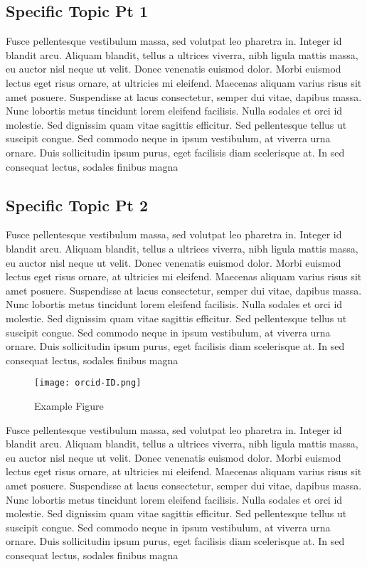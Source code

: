 \documentclass[linenumbers,RNAAS,trackchanges]{aastex631}
\begin{document}
\subsection{Specific Topic Pt 1} \label{sec:subtopic1}
Fusce pellentesque vestibulum massa, sed volutpat leo pharetra in. Integer id blandit arcu. Aliquam blandit, tellus a ultrices viverra, nibh ligula mattis massa, eu auctor nisl neque ut velit. Donec venenatis euismod dolor. Morbi euismod lectus eget risus ornare, at ultricies mi eleifend. Maecenas aliquam varius risus sit amet posuere. Suspendisse at lacus consectetur, semper dui vitae, dapibus massa. Nunc lobortis metus tincidunt lorem eleifend facilisis. Nulla sodales et orci id molestie. Sed dignissim quam vitae sagittis efficitur. Sed pellentesque tellus ut suscipit congue. Sed commodo neque in ipsum vestibulum, at viverra urna ornare. Duis sollicitudin ipsum purus, eget facilisis diam scelerisque at. In sed consequat lectus, sodales finibus magna


\subsection{Specific Topic Pt 2} \label{sec:subtopic2}
Fusce pellentesque vestibulum massa, sed volutpat leo pharetra in. Integer id blandit arcu. Aliquam blandit, tellus a ultrices viverra, nibh ligula mattis massa, eu auctor nisl neque ut velit. Donec venenatis euismod dolor. Morbi euismod lectus eget risus ornare, at ultricies mi eleifend. Maecenas aliquam varius risus sit amet posuere. Suspendisse at lacus consectetur, semper dui vitae, dapibus massa. Nunc lobortis metus tincidunt lorem eleifend facilisis. Nulla sodales et orci id molestie. Sed dignissim quam vitae sagittis efficitur. Sed pellentesque tellus ut suscipit congue. Sed commodo neque in ipsum vestibulum, at viverra urna ornare. Duis sollicitudin ipsum purus, eget facilisis diam scelerisque at. In sed consequat lectus, sodales finibus magna

\begin{figure}[H]
    \centering
    \texttt{[image: orcid-ID.png]}
    \caption{Example Figure}
    \label{fig:my_label}
\end{figure}

Fusce pellentesque vestibulum massa, sed volutpat leo pharetra in. Integer id blandit arcu. Aliquam blandit, tellus a ultrices viverra, nibh ligula mattis massa, eu auctor nisl neque ut velit. Donec venenatis euismod dolor. Morbi euismod lectus eget risus ornare, at ultricies mi eleifend. Maecenas aliquam varius risus sit amet posuere. Suspendisse at lacus consectetur, semper dui vitae, dapibus massa. Nunc lobortis metus tincidunt lorem eleifend facilisis. Nulla sodales et orci id molestie. Sed dignissim quam vitae sagittis efficitur. Sed pellentesque tellus ut suscipit congue. Sed commodo neque in ipsum vestibulum, at viverra urna ornare. Duis sollicitudin ipsum purus, eget facilisis diam scelerisque at. In sed consequat lectus, sodales finibus magna
\end{document}
